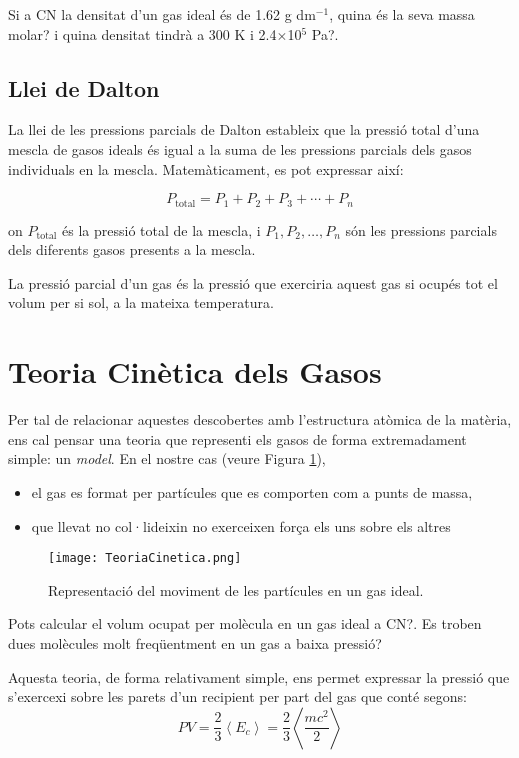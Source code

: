        
    \begin{exr}
        Si a CN la densitat d'un gas ideal és de 1.62 g dm$^{-1}$, quina és la seva massa molar? i quina densitat tindrà a 300 K i 2.4$\times$10$^5$ Pa?.
        \end{exr}

\subsection{Llei de Dalton}
La llei de les pressions parcials de Dalton estableix que la pressió total d'una mescla de gasos ideals és igual a la suma de les pressions parcials dels gasos individuals en la mescla. Matemàticament, es pot expressar així:

\[
P_{\text{total}} = P_1 + P_2 + P_3 + \cdots + P_n
\]

on \(P_{\text{total}}\) és la pressió total de la mescla, i \(P_1, P_2, \dots, P_n\) són les pressions parcials dels diferents gasos presents a la mescla.

La pressió parcial d'un gas és la pressió que exerciria aquest gas si ocupés tot el volum per si sol, a la mateixa temperatura.
  


\section{Teoria Cinètica dels Gasos}

Per tal de relacionar aquestes descobertes amb l'estructura atòmica de la matèria, ens cal pensar una teoria que representi els gasos de forma extremadament simple: un \textit{model}. En el nostre cas (veure Figura \ref{fig:TeoriaCinetica}),
\begin{itemize}
\item el gas es format per partícules que es comporten com a punts de massa,
\item que llevat no col·lideixin no exerceixen força els uns sobre els altres
\end{itemize}
\begin{figure}[h]
\centering
\texttt{[image: TeoriaCinetica.png]}
\caption{Representació del moviment de les partícules en un gas ideal.}
\label{fig:TeoriaCinetica}
\end{figure}
\begin{exr}
Pots calcular el volum ocupat per molècula en un gas ideal a CN?. Es troben dues molècules molt freqüentment en un gas a baixa pressió?
\end{exr}
Aquesta teoria, de forma relativament simple, ens permet expressar la pressió que s'exercexi sobre les parets d'un recipient per part del gas que conté segons:
\[
PV=\frac{2}{3} \left< E_c \right> = \frac{2}{3} \left< \frac{mc^2}{2} \right>
\]

